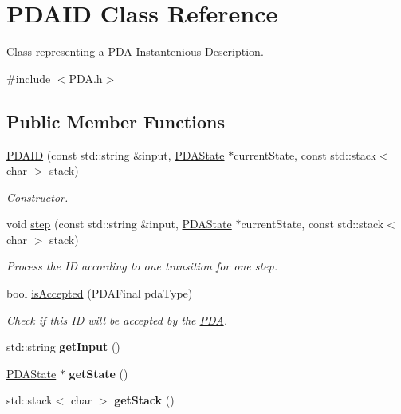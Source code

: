 \hypertarget{class_p_d_a_i_d}{\section{P\-D\-A\-I\-D Class Reference}
\label{class_p_d_a_i_d}
}


Class representing a \hyperlink{class_p_d_a}{P\-D\-A} Instantenious Description.  




{\ttfamily \#include $<$P\-D\-A.\-h$>$}

\subsection*{Public Member Functions}
\begin{DoxyCompactItemize}
\item 
\hyperlink{class_p_d_a_i_d_a2771c16218559b027029c12a0135353a}{P\-D\-A\-I\-D} (const std\-::string \&input, \hyperlink{class_p_d_a_state}{P\-D\-A\-State} $\ast$current\-State, const std\-::stack$<$ char $>$ stack)
\begin{DoxyCompactList}\small\item\em Constructor. \end{DoxyCompactList}\item 
void \hyperlink{class_p_d_a_i_d_aa5ffd9bde5a3a86648ffedfd3932070b}{step} (const std\-::string \&input, \hyperlink{class_p_d_a_state}{P\-D\-A\-State} $\ast$current\-State, const std\-::stack$<$ char $>$ stack)
\begin{DoxyCompactList}\small\item\em Process the I\-D according to one transition for one step. \end{DoxyCompactList}\item 
bool \hyperlink{class_p_d_a_i_d_a85f6765dd9c0244f07dc44822c223d46}{is\-Accepted} (P\-D\-A\-Final pda\-Type)
\begin{DoxyCompactList}\small\item\em Check if this I\-D will be accepted by the \hyperlink{class_p_d_a}{P\-D\-A}. \end{DoxyCompactList}\item 
\hypertarget{class_p_d_a_i_d_a55955e1bb7212989f671863f2f628f79}{std\-::string {\bfseries get\-Input} ()}\label{class_p_d_a_i_d_a55955e1bb7212989f671863f2f628f79}

\item 
\hypertarget{class_p_d_a_i_d_a87dbd8ad4bec917fbf17959e87b74884}{\hyperlink{class_p_d_a_state}{P\-D\-A\-State} $\ast$ {\bfseries get\-State} ()}\label{class_p_d_a_i_d_a87dbd8ad4bec917fbf17959e87b74884}

\item 
\hypertarget{class_p_d_a_i_d_acde6beb96c3f71a8f2e287828a7ab66d}{std\-::stack$<$ char $>$ {\bfseries get\-Stack} ()}\label{class_p_d_a_i_d_acde6beb96c3f71a8f2e287828a7ab66d}

\end{DoxyCompactItemize}
